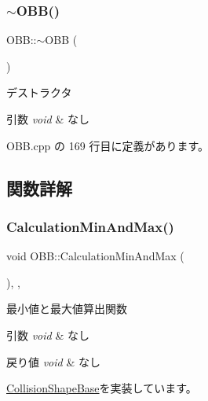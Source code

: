 \subsubsection{\texorpdfstring{$\sim$\+O\+B\+B()}{~OBB()}}
{\footnotesize\ttfamily O\+B\+B\+::$\sim$\+O\+BB (\begin{DoxyParamCaption}{ }\end{DoxyParamCaption})}



デストラクタ 


\begin{DoxyParams}{引数}
{\em void} & なし \\
\hline
\end{DoxyParams}


 O\+B\+B.\+cpp の 169 行目に定義があります。



\subsection{関数詳解}
\mbox{\label{class_o_b_b_a638080ada1be9bef353359358dba23bc}} 
\subsubsection{\texorpdfstring{Calculation\+Min\+And\+Max()}{CalculationMinAndMax()}}
{\footnotesize\ttfamily void O\+B\+B\+::\+Calculation\+Min\+And\+Max (\begin{DoxyParamCaption}{ }\end{DoxyParamCaption})\hspace{0.3cm}{\ttfamily [override]}, {\ttfamily [private]}, {\ttfamily [virtual]}}



最小値と最大値算出関数 


\begin{DoxyParams}{引数}
{\em void} & なし \\
\hline
\end{DoxyParams}

\begin{DoxyRetVals}{戻り値}
{\em void} & なし \\
\hline
\end{DoxyRetVals}


\mbox{\hyperlink{class_collision_shape_base_ad227c2f83038d7c05bc6b1d510cb4000}{Collision\+Shape\+Base}}を実装しています。



